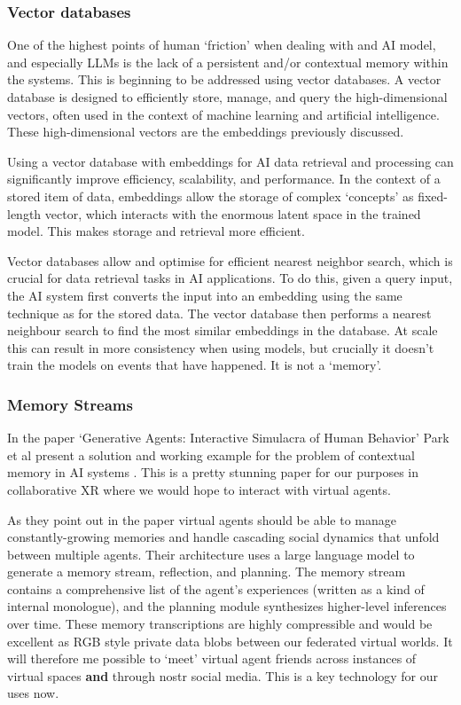 \subsubsection{Vector databases}
One of the highest points of human `friction' when dealing with and AI model, and especially LLMs is the lack of a persistent and/or contextual memory within the systems. This is beginning to be addressed using vector databases.
A vector database is designed to efficiently store, manage, and query the high-dimensional vectors, often used in the context of machine learning and artificial intelligence. These high-dimensional vectors are the embeddings previously discussed.\par 
Using a vector database with embeddings for AI data retrieval and processing can significantly improve efficiency, scalability, and performance. In the context of a stored item of data, embeddings allow the storage of complex `concepts' as fixed-length vector, which interacts with the enormous latent space in the trained model. This makes storage and retrieval more efficient. \par 
Vector databases allow and optimise for efficient nearest neighbor search, which is crucial for data retrieval tasks in AI applications.
To do this, given a query input, the AI system first converts the input into an embedding using the same technique as for the stored data. The vector database then performs a nearest neighbour search to find the most similar embeddings in the database. At scale this can result in more consistency when using models, but crucially it doesn't train the models on events that have happened. It is not a `memory'.
\subsubsection{Memory Streams}
In the paper `Generative Agents: Interactive Simulacra of Human Behavior' Park et al present a solution and working example for the problem of contextual memory in AI systems \cite{park2023generative}. This is a pretty stunning paper for our purposes in collaborative XR where we would hope to interact with virtual agents. \par
As they point out in the paper virtual agents should be able to manage constantly-growing memories and handle cascading social dynamics that unfold between multiple agents. Their architecture uses a large language model to generate a memory stream, reflection, and planning. The memory stream contains a comprehensive list of the agent's experiences (written as a kind of internal monologue), and the planning module synthesizes higher-level inferences over time. These memory transcriptions are highly compressible and would be excellent as RGB style private data blobs between our federated virtual worlds. It will therefore me possible to `meet' virtual agent friends across instances of virtual spaces \textbf{and} through nostr social media. This is a key technology for our uses now.
